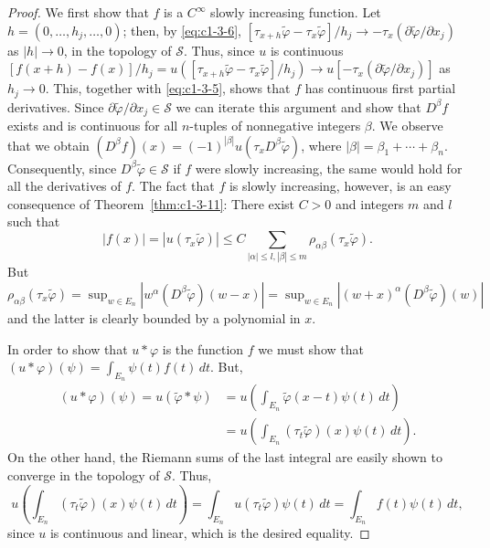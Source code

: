 \begin{proof}
We first show that $f$ is a $C^{\infty}$ slowly increasing function. Let
$h = (0, \ldots, h_{j}, \ldots, 0)$; then, by \eqref{eq:c1-3-6},
$[\tau_{x+h}\tilde{\varphi} - \tau_{x}\tilde{\varphi}]/h_{j} \to -\tau_{x}(\partial\tilde{\varphi}/\partial x_{j})$
as $|h| \to 0$, in the topology of $\mathscr{S}$. Thus, since $u$ is
continuous $[f(x + h) - f(x)]/h_{j} = u([\tau_{x+h}\tilde{\varphi} - \tau_{x}\tilde{\varphi}]/h_{j}) \to u[-\tau_{x}(\partial\tilde{\varphi}/\partial x_{j})]$
as $h_{j} \to 0$. This, together with \eqref{eq:c1-3-5}, shows that $f$ has
continuous first partial derivatives. Since
$\partial\tilde{\varphi}/\partial x_{j} \in \mathscr{S}$ we can iterate this
argument and show that $D^{\beta}f$ exists and is continuous for all
$n$-tuples of nonnegative integers $\beta$. We observe that we obtain
$(D^{\beta}f)(x) = (-1)^{|\beta|} u(\tau_{x}D^{\beta}\tilde{\varphi})$, where
$|\beta| = \beta_{1} + \cdots + \beta_{n}$. Consequently, since
$D^{\beta}\tilde{\varphi} \in \mathscr{S}$ if $f$ were slowly increasing, the
same would hold for all the derivatives of $f$. The fact that $f$ is slowly
increasing, however, is an easy consequence of Theorem~\ref{thm:c1-3-11}:
There exist $C > 0$ and integers $m$ and $l$ such that
\[
\left|f(x)\right|=\left|u(\tau_{x}\tilde{\varphi})\right|
\leq C\sum_{|\alpha|\leq l,|\beta|\leq m}\rho_{\alpha\beta}(\tau_{x}\tilde{\varphi}).
\]
But
$\rho_{\alpha\beta}(\tau_{x}\tilde{\varphi}) = \sup_{w \in E_{n}} |w^{\alpha}(D^{\beta}\tilde{\varphi})(w - x)| = \sup_{w \in E_{n}} |(w + x)^{\alpha}(D^{\beta}\tilde{\varphi})(w)|$
and the latter is clearly bounded by a polynomial in $x$.

In order to show that $u * \varphi$ is the function $f$ we must show that
$(u * \varphi)(\psi) = \int_{E_{n}} \psi(t)f(t) \, dt$. But,
\begin{align*}
(u*\varphi)(\psi)=u(\tilde{\varphi}*\psi)
&=u\left(\int_{E_{n}}\tilde{\varphi}(x-t)\psi(t)\,dt\right)\\
&=u\left(\int_{E_{n}}(\tau_{t}\tilde{\varphi})(x)\psi(t)\,dt\right).
\end{align*}
On the other hand, the Riemann sums of the last integral are easily shown to
converge in the topology of $\mathscr{S}$. Thus,
\[
u\left(\int_{E_{n}}(\tau_{t}\tilde{\varphi})(x)\psi(t)\,dt\right)
=\int_{E_{n}}u(\tau_{t}\tilde{\varphi})\psi(t)\,dt
=\int_{E_{n}}f(t)\psi(t)\,dt,
\]
since $u$ is continuous and linear, which is the desired equality.
\end{proof}

